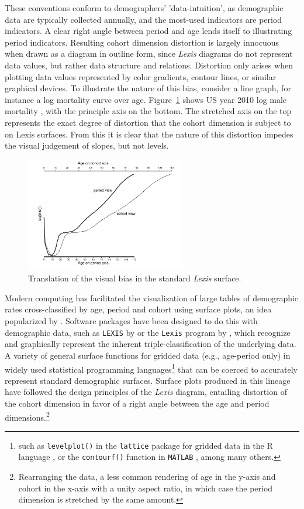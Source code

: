 \documentclass[a4paper]{article}
\begin{document}
These conventions conform to demographers' 'data-intuition', as demographic data are typically collected annually, and the most-used indicators are period indicators. A clear right angle between period and age lends itself to illustrating period indicators. Resulting cohort dimension distortion is largely innocuous when drawn as a diagram in outline form, since \textit{Lexis} diagrams do not represent data values, but rather data structure and relations. Distortion only arises when plotting data values represented by color gradients, contour lines, or similar graphical devices. To illustrate the nature of this bias, consider a line graph, for instance a log mortality curve over age. Figure~\ref{Fig0} shows US year 2010 log male mortality , with the principle axis on the bottom. The stretched axis on the top represents the exact degree of distortion that the cohort dimension is subject to on Lexis surfaces. From this it is clear that the nature of this distortion impedes the visual judgement of slopes, but not levels. 

\begin{figure}[ht!]
\centering
\caption{Translation of the visual bias in the standard \textit{Lexis} surface.}
\label{Fig0}
\includegraphics[width=7cm,height=5cm]{Figs/LineGraph.pdf}
\end{figure} 

Modern computing has facilitated the visualization of large tables of demographic rates cross-classified by age, period and cohort using surface plots, an idea popularized by \citet{arthur1984some}. Software packages have been designed to do this with demographic data, such as \texttt{LEXIS} by \citet{vaupel1987thousands} or the \texttt{Lexis} program by \citet{andreev1999overview}, which recognize and graphically represent the inherent triple-classification of the underlying data. A variety of general surface functions for gridded data (e.g., age-period only) in widely used statistical programming languages\footnote{such as \texttt{levelplot()} in the \texttt{lattice} package \citep{sarkar2008lattice} for gridded data in the R language \citep{ihaka1996r}, or the \texttt{contourf()} function in \texttt{MATLAB} \citep{MATLAB2010}, among many others.} that can be coerced to accurately represent standard demographic surfaces. Surface plots produced in this lineage have followed the design principles of the \textit{Lexis} diagram, entailing distortion of the cohort dimension in favor of a right angle between the age and period dimensions.\footnote{Rearranging the data, a less common rendering of age in the y-axis and cohort in the x-axis with a unity aspect ratio, in which case the period dimension is stretched by the same amount.}
\end{document}

